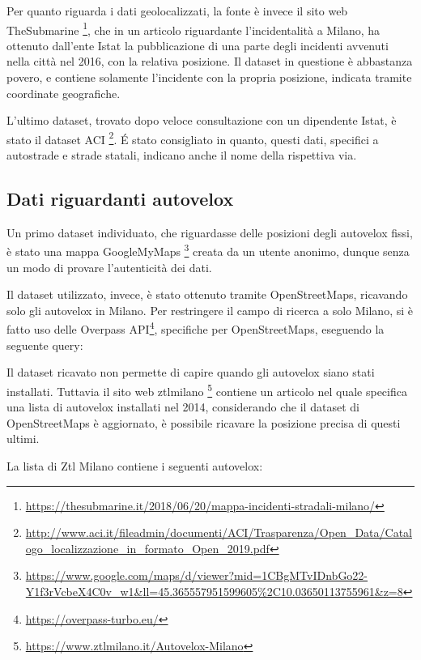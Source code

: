 \documentclass[a4paper]{report}
\begin{document}
Per quanto riguarda i dati geolocalizzati, 
la fonte è invece il sito web TheSubmarine
\footnote{\url{https://thesubmarine.it/2018/06/20/mappa-incidenti-stradali-milano/}},
che in un articolo riguardante l'incidentalità a Milano, 
ha ottenuto dall'ente Istat la pubblicazione di una parte degli 
incidenti avvenuti nella città nel 2016, con la relativa posizione.
Il dataset in questione è abbastanza povero, e contiene solamente l'incidente con la 
propria posizione, indicata tramite coordinate geografiche.

L'ultimo dataset, trovato dopo veloce consultazione con un dipendente Istat, è stato il dataset ACI
\footnote{\url{http://www.aci.it/fileadmin/documenti/ACI/Trasparenza/Open_Data/Catalogo_localizzazione_in_formato_Open_2019.pdf}}.
\'E stato consigliato in quanto, questi dati, specifici a autostrade e strade statali, 
indicano anche il nome della rispettiva via.

\subsection{Dati riguardanti autovelox}
Un primo dataset individuato, che riguardasse delle posizioni degli autovelox fissi, 
è stato una mappa GoogleMyMaps
\footnote{\url{https://www.google.com/maps/d/viewer?mid=1CBgMTvIDnbGo22-Y1f3rVcbeX4C0v_w1&ll=45.365557951599605\%2C10.03650113755961&z=8}} 
creata da un utente anonimo, dunque senza un modo di provare l'autenticità dei dati.

Il dataset utilizzato, invece, è stato ottenuto tramite OpenStreetMaps, ricavando solo gli autovelox 
in Milano. 
Per restringere il campo di ricerca a solo Milano, si è fatto uso delle Overpass API\footnote{\url{https://overpass-turbo.eu/}}, 
specifiche per OpenStreetMaps, eseguendo la seguente query: 



Il dataset ricavato non permette di capire quando gli autovelox siano stati installati.
Tuttavia il sito web ztlmilano
\footnote{\url{https://www.ztlmilano.it/Autovelox-Milano}} 
contiene un articolo nel quale specifica una lista di 
autovelox installati nel 2014, considerando che il dataset di OpenStreetMaps è aggiornato, 
è possibile ricavare la posizione precisa di questi ultimi.

La lista di Ztl Milano contiene i seguenti autovelox: 
\end{document}
